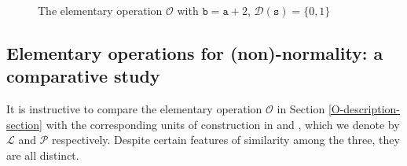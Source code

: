 \documentclass[12pt, twoside]{article}
\theoremstyle{definition}
\numberwithin{equation}{section}
\begin{document}
\begin{figure}
\begin{center}
\caption{The elementary operation $\mathscr{O}$ with $\mathtt b = \mathtt a +2$, $\mathscr{D}(\mathtt s) = \{0, 1\}$} \label{Interval}
\end{center} 
\end{figure}
\subsection{Elementary operations for (non)-normality: a comparative study} \label{comparison-section} 
It is instructive to compare the elementary operation $\mathscr{O}$ in Section \ref{O-description-section} with the corresponding units of construction in \cite{l86} and \cite{p81}, which we denote by $\mathscr{L}$ and $\mathscr{P}$ respectively. Despite certain features of similarity among the three, they are all distinct. 
\end{document}
